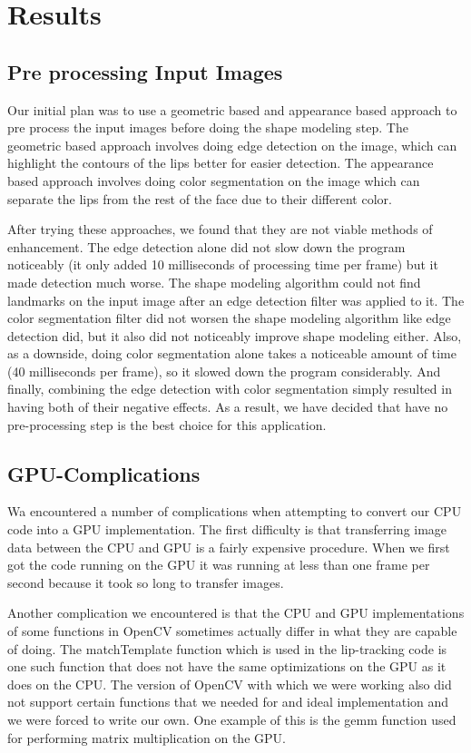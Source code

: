 \chapter{Results}

\section{Pre processing Input Images}
Our initial plan was to use a geometric based and appearance based approach to pre process the input images before doing the shape modeling step. The geometric based approach involves doing edge detection on the image, which can highlight the contours of the lips better for easier detection. The appearance based approach involves doing color segmentation on the image which can separate the lips from the rest of the face due to their different color. 

After trying these approaches, we found that they are not viable methods of enhancement. The edge detection alone did not slow down the program noticeably (it only added 10 milliseconds of processing time per frame) but it made detection much worse. The shape modeling algorithm could not find landmarks on the input image after an edge detection filter was applied to it. The color segmentation filter did not worsen the shape modeling algorithm like edge detection did, but it also did not noticeably improve shape modeling either. Also, as a downside, doing color segmentation alone takes a noticeable amount of time (40 milliseconds per frame), so it slowed down the program considerably. And finally, combining the edge detection with color segmentation simply resulted in having both of their negative effects. As a result, we have decided that have no pre-processing step is the best choice for this application.

\section{GPU-Complications}

Wa encountered a number of complications when attempting to convert our CPU code into a GPU implementation. The first difficulty is that transferring image data between the CPU and GPU is a fairly expensive procedure. When we first got the code running on the GPU it was running at less than one frame per second because it took so long to transfer images.

Another complication we encountered is that the CPU and GPU implementations of some functions in OpenCV sometimes actually differ in what they are capable of doing. The matchTemplate function which is used in the lip-tracking code is one such function that does not have the same optimizations on the GPU as it does on the CPU. The version of OpenCV with which we were working also did not support certain functions that we needed for and ideal implementation and we were forced to write our own. One example of this is the gemm function used for performing matrix multiplication on the GPU.